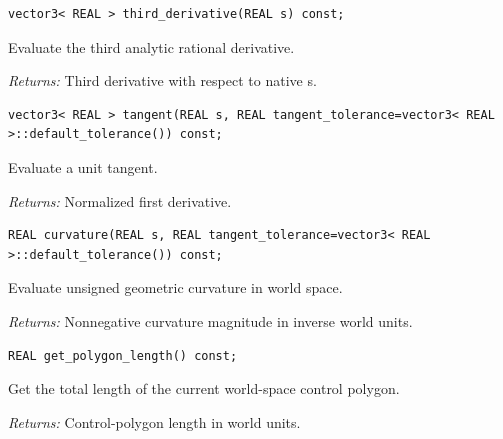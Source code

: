 \par\noindent\begin{minipage}{\linewidth}
\begin{lstlisting}[style=apireference]
vector3< REAL > third_derivative(REAL s) const;
\end{lstlisting}
{\footnotesize Evaluate the third analytic rational derivative.\par}
{\footnotesize\textit{Returns:} Third derivative with respect to native s.\par}
\end{minipage}\par\vspace{1pt}
\par\noindent\begin{minipage}{\linewidth}
\begin{lstlisting}[style=apireference]
vector3< REAL > tangent(REAL s, REAL tangent_tolerance=vector3< REAL >::default_tolerance()) const;
\end{lstlisting}
{\footnotesize Evaluate a unit tangent.\par}
{\footnotesize\textit{Returns:} Normalized first derivative.\par}
\end{minipage}\par\vspace{1pt}
\par\noindent\begin{minipage}{\linewidth}
\begin{lstlisting}[style=apireference]
REAL curvature(REAL s, REAL tangent_tolerance=vector3< REAL >::default_tolerance()) const;
\end{lstlisting}
{\footnotesize Evaluate unsigned geometric curvature in world space.\par}
{\footnotesize\textit{Returns:} Nonnegative curvature magnitude in inverse world units.\par}
\end{minipage}\par\vspace{1pt}
\par\noindent\begin{minipage}{\linewidth}
\begin{lstlisting}[style=apireference]
REAL get_polygon_length() const;
\end{lstlisting}
{\footnotesize Get the total length of the current world-space control polygon.\par}
{\footnotesize\textit{Returns:} Control-polygon length in world units.\par}
\end{minipage}\par\vspace{1pt}
